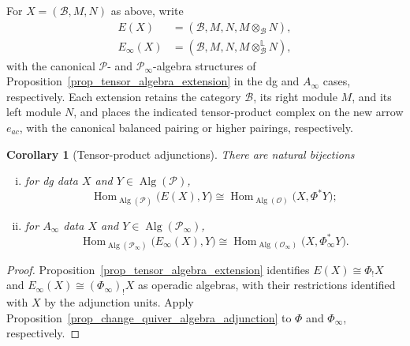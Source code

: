 \documentclass[11pt,letterpaper]{article}
\numberwithin{equation}{section}
\theoremstyle{plain}
\newtheorem{cor}[thm]{Corollary}
\theoremstyle{definition}
\theoremstyle{remark}
\begin{document}
For $X=(\mathcal B,M,N)$ as above, write
\[
\begin{aligned}
 E(X)&=(\mathcal B,M,N,M\otimes_{\mathcal B}N),\\
 E_\infty(X)&=(\mathcal B,M,N,M\otimes_{\mathcal B}^{\mathbb L}N),
\end{aligned}
\]
with the canonical $\mathscr P$- and $\mathscr P_\infty$-algebra
structures of Proposition~\ref{prop_tensor_algebra_extension}
in the dg and $A_\infty$ cases, respectively.
Each extension retains the category $\mathcal B$, its right module
$M$, and its left module $N$, and places the indicated tensor-product
complex on the new arrow $e_{ac}$, with the canonical balanced
pairing or higher pairings, respectively.

\begin{cor}[Tensor-product adjunctions]
\label{cor_tensor_algebra_adjunction}
There are natural bijections
\begin{enumerate}[(i)]
\item for dg data $X$ and $Y\in\operatorname{Alg}(\mathscr P)$,
\begin{equation}\label{eq_tensor_dg_algebra_adjunction}
 \operatorname{Hom}_{\operatorname{Alg}(\mathscr P)}\bigl(E(X),Y\bigr)
 \cong
 \operatorname{Hom}_{\operatorname{Alg}(\mathscr O)}\bigl(X,\Phi^*Y\bigr);
\end{equation}
\item for $A_\infty$ data $X$ and
$Y\in\operatorname{Alg}(\mathscr P_\infty)$,
\begin{equation}\label{eq_tensor_Ainfinity_algebra_adjunction}
 \operatorname{Hom}_{\operatorname{Alg}(\mathscr P_\infty)}
 \bigl(E_\infty(X),Y\bigr)
 \cong
 \operatorname{Hom}_{\operatorname{Alg}(\mathscr O_\infty)}
 \bigl(X,\Phi_\infty^*Y\bigr).
\end{equation}
\end{enumerate}
\end{cor}
\begin{proof}
Proposition~\ref{prop_tensor_algebra_extension} identifies
$E(X)\cong\Phi_!X$ and
$E_\infty(X)\cong(\Phi_\infty)_!X$ as operadic algebras, with
their restrictions identified with $X$ by the adjunction units.
Apply Proposition~\ref{prop_change_quiver_algebra_adjunction}
to $\Phi$ and $\Phi_\infty$, respectively.
\end{proof}



	
\end{document}

